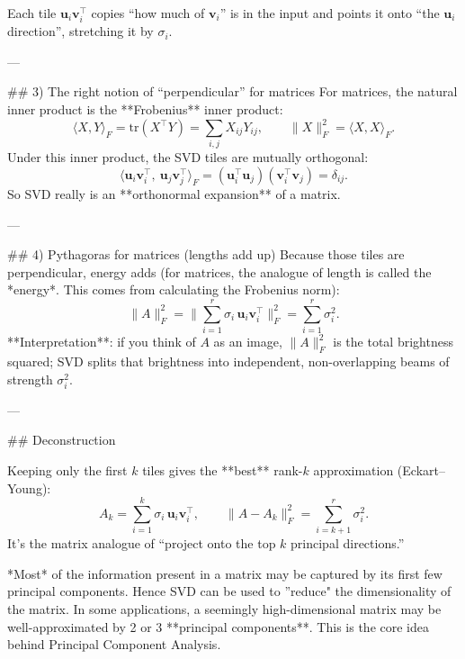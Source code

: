 Each tile $\mathbf{u}_i\mathbf{v}_i^\top$ copies “how much of $\mathbf{v}_i$” is in the input and points it onto “the $\mathbf{u}_i$ direction”, stretching it by $\sigma_i$. 

---

## 3) The right notion of “perpendicular” for matrices
For matrices, the natural inner product is the **Frobenius** inner product:
$$
\langle X,Y\rangle_F=\mathrm{tr}(X^\top Y)=\sum_{i,j}X_{ij}Y_{ij},
\qquad
\|X\|_F^2=\langle X,X\rangle_F.
$$
Under this inner product, the SVD tiles are mutually orthogonal:
$$
\big\langle \mathbf{u}_i\mathbf{v}_i^\top,\ \mathbf{u}_j\mathbf{v}_j^\top\big\rangle_F
=(\mathbf{u}_i^\top\mathbf{u}_j)(\mathbf{v}_i^\top\mathbf{v}_j)=\delta_{ij}.
$$
So SVD really is an **orthonormal expansion** of a matrix.

---

## 4) Pythagoras for matrices (lengths add up)
Because those tiles are perpendicular, energy adds (for matrices, the analogue of length is called the *energy*. This comes from calculating the Frobenius norm):
$$
\|A\|_F^2
=\Big\|\sum_{i=1}^r \sigma_i\,\mathbf{u}_i\mathbf{v}_i^\top\Big\|_F^2
=\sum_{i=1}^r \sigma_i^2.
$$
**Interpretation**: if you think of $A$ as an image, $\|A\|_F^2$ is the total brightness squared; SVD splits that brightness into independent, non-overlapping beams of strength $\sigma_i^2$.

---

## Deconstruction

Keeping only the first \(k\) tiles gives the **best** rank-\(k\) approximation (Eckart–Young):
$$
A_k=\sum_{i=1}^k \sigma_i\,\mathbf{u}_i\mathbf{v}_i^\top,
\qquad
\|A-A_k\|_F^2=\sum_{i=k+1}^r \sigma_i^2.
$$
It’s the matrix analogue of “project onto the top $k$ principal directions.”

*Most* of the information present in a matrix may be captured by its first few principal components. Hence SVD can be used to ''reduce" the dimensionality of the matrix. In some applications, a seemingly high-dimensional matrix may be well-approximated by 2 or 3 **principal components**. This is the core idea behind Principal Component Analysis. 


